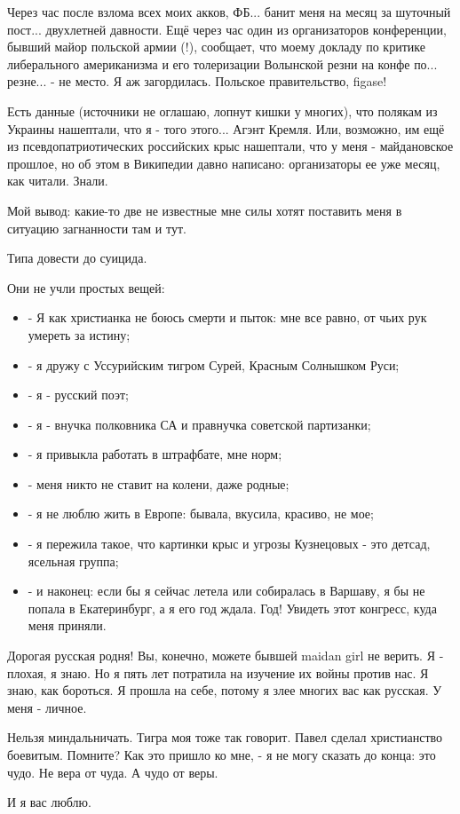 Через час после взлома всех моих акков, ФБ... банит меня на месяц за шуточный
пост... двухлетней давности. Ещё через час один из организаторов конференции,
бывший майор польской армии (!), сообщает, что моему докладу по критике
либерального американизма и его толеризации Волынской резни на конфе по...
резне... - не место. Я аж загордилась. Польское правительство, figase!

Есть данные (источники не оглашаю, лопнут кишки у многих), что полякам из
Украины нашептали, что я - того этого... Агэнт Кремля. Или, возможно, им ещё из
псевдопатриотических российских крыс нашептали, что у меня - майдановское
прошлое, но об этом в Википедии давно написано: организаторы ее уже месяц, как
читали. Знали.

Мой вывод: какие-то две не известные мне силы хотят поставить меня в ситуацию
загнанности там и тут. 

Типа довести до суицида.

Они не учли простых вещей: 

\begin{itemize}
  \item - Я как христианка не боюсь смерти и пыток: мне все равно, от чьих рук умереть за истину;
  \item - я дружу с Уссурийским тигром Сурей, Красным Солнышком Руси;
  \item - я - русский поэт;
  \item - я - внучка полковника СА и правнучка советской партизанки;
  \item - я привыкла работать в штрафбате, мне норм;
  \item - меня никто не ставит на колени, даже родные;
  \item - я не люблю жить в Европе: бывала, вкусила, красиво, не мое;
  \item - я пережила такое, что картинки крыс и угрозы Кузнецовых - это детсад, ясельная группа;
	\item - и наконец: если бы я сейчас летела или собиралась в Варшаву, я бы не
	попала в Екатеринбург, а я его год ждала. Год! Увидеть этот конгресс, куда
	меня приняли.
\end{itemize}

Дорогая русская родня! Вы, конечно, можете бывшей maidan girl не верить. Я -
плохая, я знаю. Но я пять лет потратила на изучение их войны против нас. Я
знаю, как бороться. Я прошла на себе, потому я злее многих вас как русская. У
меня - личное. 

Нельзя миндальничать. Тигра моя тоже так говорит. Павел сделал христианство
боевитым. Помните? Как это пришло ко мне, - я не могу сказать до конца: это
чудо. Не вера от чуда. А чудо от веры. 

И я вас люблю.
